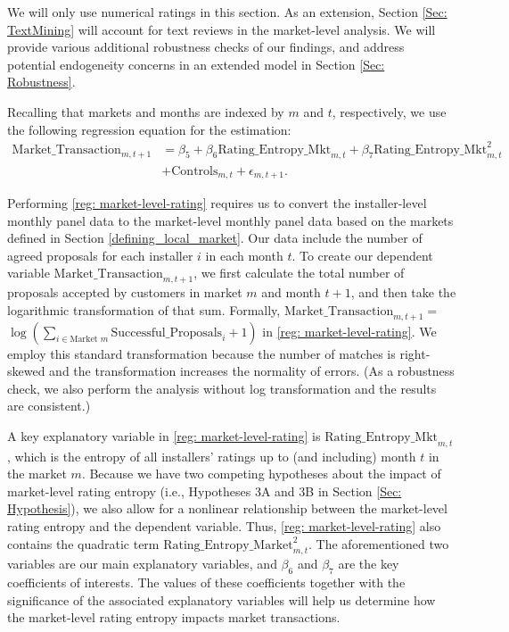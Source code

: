 \documentclass[msom,blindrev]{informs3}
\begin{document}
We will only use numerical ratings in this section. As an extension, Section \ref{Sec: TextMining} will account for text reviews in the market-level analysis. We will provide various additional robustness checks of our findings, and address potential endogeneity concerns in an extended model in Section \ref{Sec: Robustness}.



Recalling that markets and months are indexed by $m$ and $t$, respectively, we use the following regression equation for the estimation:
\begin{align} \nonumber
   \text{Market\_Transaction}_{m,t+1} & =\beta_{5} + \beta_{6} \text{Rating\_Entropy\_Mkt}_{m,t}+ \beta_{7} \text{Rating\_Entropy\_Mkt}_{m,t}^2\\ \label{reg: market-level-rating}
   &+ \text{Controls}_{m,t}  +\epsilon_{m,t+1}.
\end{align}

Performing \eqref{reg: market-level-rating} requires us to convert the installer-level monthly panel data to the market-level monthly panel data based on the markets defined in Section \ref{defining_local_market}. Our data include the number of agreed proposals for each installer $i$ in each month $t$. To create our dependent variable $\text{Market\_Transaction}_{m,t+1}$, we first calculate the total number of proposals accepted by customers in market $m$ and month $t+1$, and then take the logarithmic transformation of that sum. Formally, $\text{Market\_Transaction}_{m,t+1} =$ $\log\left( \sum_{i \in \text{Market\ } m} \text{Successful\_Proposals}_{i}+ 1 \right)$ in \eqref{reg: market-level-rating}.  We employ this standard transformation because the number of matches is right-skewed and the transformation increases the normality of errors. (As a robustness check, we also perform the analysis without log transformation and the results are consistent.)

A key explanatory variable in \eqref{reg: market-level-rating} is $\text{Rating\_Entropy\_Mkt}_{m,t}$, which is the entropy of all installers' ratings up to (and including) month $t$ in the market $m$.
 Because we have two competing hypotheses about the impact of market-level rating entropy (i.e., Hypotheses 3A and 3B in Section \ref{Sec: Hypothesis}), we also allow for a  nonlinear relationship between the market-level rating entropy and the dependent variable. Thus, \eqref{reg: market-level-rating} also contains the quadratic term  $\text{Rating\_Entropy\_Market}_{m,t}^{2}$. The aforementioned two variables are our main explanatory variables, and $\beta_{6}$ and $\beta_{7}$ are the key coefficients of interests. The values of these coefficients together with the significance of the associated explanatory variables will help us determine how the market-level rating entropy impacts market transactions.
\end{document}
